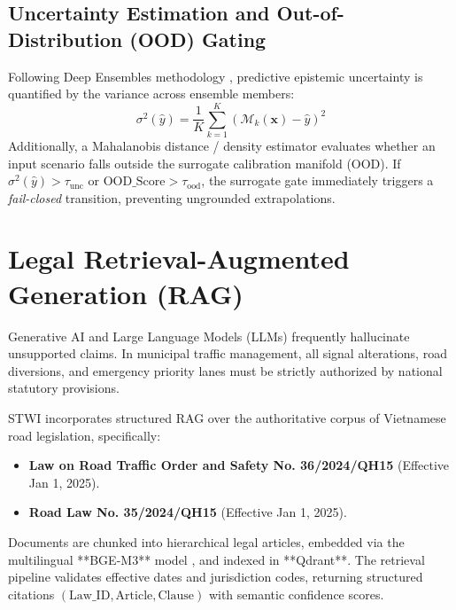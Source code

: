 \subsection{Uncertainty Estimation and Out-of-Distribution (OOD) Gating}
Following Deep Ensembles methodology \cite{lakshminarayanan2017ade}, predictive epistemic uncertainty is quantified by the variance across ensemble members:
\begin{equation}
  \sigma^2(\hat{y}) = \frac{1}{K} \sum_{k=1}^K (\mathcal{M}_k(\mathbf{x}) - \hat{y})^2
\end{equation}
Additionally, a Mahalanobis distance / density estimator evaluates whether an input scenario falls outside the surrogate calibration manifold (OOD). If $\sigma^2(\hat{y}) > \tau_{\text{unc}}$ or $\text{OOD\_Score} > \tau_{\text{ood}}$, the surrogate gate immediately triggers a \textit{fail-closed} transition, preventing ungrounded extrapolations.

\section{Legal Retrieval-Augmented Generation (RAG)}
Generative AI and Large Language Models (LLMs) frequently hallucinate unsupported claims. In municipal traffic management, all signal alterations, road diversions, and emergency priority lanes must be strictly authorized by national statutory provisions.

STWI incorporates structured RAG \cite{lewis2020rag} over the authoritative corpus of Vietnamese road legislation, specifically:
\begin{itemize}[leftmargin=1.5cm, label=$\bullet$]
  \item \textbf{Law on Road Traffic Order and Safety No. 36/2024/QH15} (Effective Jan 1, 2025).
  \item \textbf{Road Law No. 35/2024/QH15} (Effective Jan 1, 2025).
\end{itemize}
Documents are chunked into hierarchical legal articles, embedded via the multilingual **BGE-M3** model \cite{chen2023bge}, and indexed in **Qdrant**. The retrieval pipeline validates effective dates and jurisdiction codes, returning structured citations $(\text{Law\_ID}, \text{Article}, \text{Clause})$ with semantic confidence scores.


